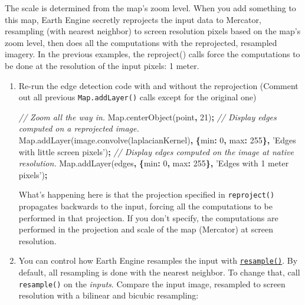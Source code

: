 \documentclass[
]{article}
\newenvironment{Shaded}{\begin{snugshade}}{\end{snugshade}}
\newcommand{\AttributeTok}[1]{\textcolor[rgb]{0.77,0.63,0.00}{#1}}
\newcommand{\CommentTok}[1]{\textcolor[rgb]{0.56,0.35,0.01}{\textit{#1}}}
\newcommand{\DataTypeTok}[1]{\textcolor[rgb]{0.13,0.29,0.53}{#1}}
\newcommand{\DecValTok}[1]{\textcolor[rgb]{0.00,0.00,0.81}{#1}}
\newcommand{\NormalTok}[1]{#1}
\newcommand{\OperatorTok}[1]{\textcolor[rgb]{0.81,0.36,0.00}{\textbf{#1}}}
\newcommand{\StringTok}[1]{\textcolor[rgb]{0.31,0.60,0.02}{#1}}
\newcommand{\VariableTok}[1]{\textcolor[rgb]{0.00,0.00,0.00}{#1}}
\begin{document}
The scale is determined from the map's zoom level. When you add something to this map, Earth Engine secretly reprojects the input data to Mercator, resampling (with nearest neighbor) to screen resolution pixels based on the map's zoom level, then does all the computations with the reprojected, resampled imagery. In the previous examples, the reproject() calls force the computations to be done at the resolution of the input pixels: 1 meter.

\begin{enumerate}
\def\labelenumi{\arabic{enumi}.}
\item
  Re-run the edge detection code with and without the reprojection (Comment out all previous \texttt{Map.addLayer()} calls except for the original one)

\begin{Shaded}
\begin{Highlighting}[]
\CommentTok{// Zoom all the way in.}
\VariableTok{Map}\NormalTok{.}\AttributeTok{centerObject}\NormalTok{(point}\OperatorTok{,} \DecValTok{21}\NormalTok{)}\OperatorTok{;}
\CommentTok{// Display edges computed on a reprojected image.}
\VariableTok{Map}\NormalTok{.}\AttributeTok{addLayer}\NormalTok{(}\VariableTok{image}\NormalTok{.}\AttributeTok{convolve}\NormalTok{(laplacianKernel)}\OperatorTok{,} \OperatorTok{\{}\DataTypeTok{min}\OperatorTok{:} \DecValTok{0}\OperatorTok{,} \DataTypeTok{max}\OperatorTok{:} \DecValTok{255}\OperatorTok{\},} 
       \StringTok{'Edges with little screen pixels'}\NormalTok{)}\OperatorTok{;}
\CommentTok{// Display edges computed on the image at native resolution.}
\VariableTok{Map}\NormalTok{.}\AttributeTok{addLayer}\NormalTok{(edges}\OperatorTok{,} \OperatorTok{\{}\DataTypeTok{min}\OperatorTok{:} \DecValTok{0}\OperatorTok{,} \DataTypeTok{max}\OperatorTok{:} \DecValTok{255}\OperatorTok{\},} 
       \StringTok{'Edges with 1 meter pixels'}\NormalTok{)}\OperatorTok{;} 
\end{Highlighting}
\end{Shaded}

  What's happening here is that the projection specified in \texttt{reproject()} propagates backwards to the input, forcing all the computations to be performed in that projection. If you don't specify, the computations are performed in the projection and scale of the map (Mercator) at screen resolution.
\item
  You can control how Earth Engine resamples the input with \href{https://developers.google.com/earth-engine/guides/resample}{\texttt{resample()}}. By default, all resampling is done with the nearest neighbor. To change that, call \texttt{resample()} on the \emph{inputs}. Compare the input image, resampled to screen resolution with a bilinear and bicubic resampling:


\end{enumerate}
\end{document}
